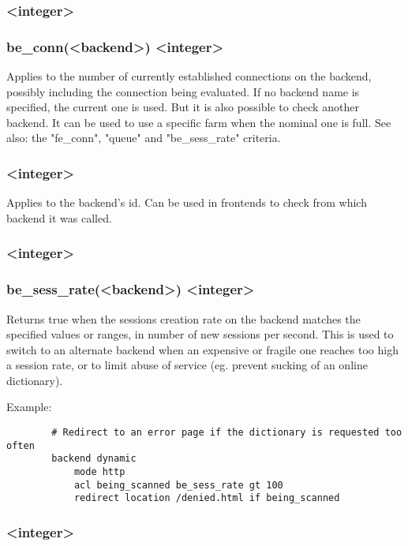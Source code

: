 \subsubsection[be\_conn]{ <integer>}
\subsubsection*{be\_conn(<backend>) <integer>}
  Applies to the number of currently established connections on the backend,
  possibly including the connection being evaluated. If no backend name is
  specified, the current one is used. But it is also possible to check another
  backend. It can be used to use a specific farm when the nominal one is full.
  See also: the "fe\_conn", "queue" and "be\_sess\_rate" criteria.

\subsubsection[be\_id]{ <integer>}
  Applies to the backend's id. Can be used in frontends to check from which
  backend it was called.

\subsubsection[be\_sess\_rate]{ <integer>}
\subsubsection*{be\_sess\_rate(<backend>) <integer>}
  Returns true when the sessions creation rate on the backend matches the
  specified values or ranges, in number of new sessions per second. This is
  used to switch to an alternate backend when an expensive or fragile one
  reaches too high a session rate, or to limit abuse of service (eg. prevent
  sucking of an online dictionary).

  Example:
  \begin{verbatim}
        # Redirect to an error page if the dictionary is requested too often
        backend dynamic
            mode http
            acl being_scanned be_sess_rate gt 100
            redirect location /denied.html if being_scanned
  \end{verbatim}

\subsubsection[connslots]{ <integer>}

